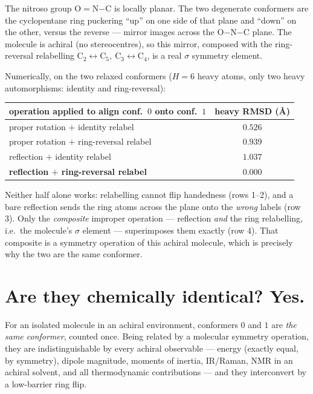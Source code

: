 \documentclass[11pt]{article}
\begin{document}
The nitroso group \mbox{O$=$N$-$C} is locally planar. The two degenerate
conformers are the cyclopentane ring puckering ``up'' on one side of that plane
and ``down'' on the other, versus the reverse --- mirror images across the
O$-$N$-$C plane. The molecule is achiral (no stereocentres), so this mirror,
composed with the ring-reversal relabelling $\text{C}_2\!\leftrightarrow\!
\text{C}_5,\ \text{C}_3\!\leftrightarrow\!\text{C}_4$, is a real $\sigma$
symmetry element.

Numerically, on the two relaxed conformers ($H=6$ heavy atoms, only two heavy
automorphisms: identity and ring-reversal):

\begin{center}
\begin{tabular}{lc}
\toprule
operation applied to align conf.\ $0$ onto conf.\ $1$ & heavy RMSD (\AA)\\
\midrule
proper rotation $+$ identity relabel        & $0.526$\\
proper rotation $+$ ring-reversal relabel   & $0.939$\\
reflection $+$ identity relabel             & $1.037$\\
\textbf{reflection $+$ ring-reversal relabel} & $\mathbf{0.000}$\\
\bottomrule
\end{tabular}
\end{center}

Neither half alone works: relabelling cannot flip handedness (rows 1--2), and a
bare reflection sends the ring atoms across the plane onto the \emph{wrong}
labels (row 3). Only the \emph{composite} improper operation --- reflection
\emph{and} the ring relabelling, i.e.\ the molecule's $\sigma$ element ---
superimposes them exactly (row 4). That composite is a symmetry operation of
this achiral molecule, which is precisely why the two are the same conformer.

\section{Are they chemically identical? Yes.}

For an isolated molecule in an achiral environment, conformers $0$ and $1$ are
\emph{the same conformer}, counted once. Being related by a molecular symmetry
operation, they are indistinguishable by every achiral observable --- energy
(exactly equal, by symmetry), dipole magnitude, moments of inertia, IR/Raman,
NMR in an achiral solvent, and all thermodynamic contributions --- and they
interconvert by a low-barrier ring flip.
\end{document}
